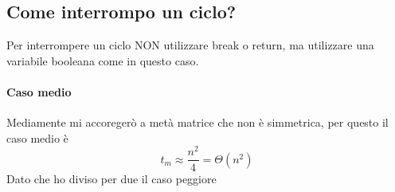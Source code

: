 \subsection{Come interrompo un ciclo?}
Per interrompere un ciclo NON utilizzare break o return, ma utilizzare una variabile booleana come in
questo caso.
\paragraph*{Caso medio} Mediamente mi accoregerò a metà matrice che non è simmetrica, 
per questo il caso medio è 
\begin{equation*}
    t_m \approx \frac{n^2}{4} = \Theta(n^2)
\end{equation*}
Dato che ho diviso per due il caso peggiore
